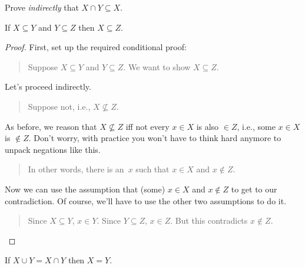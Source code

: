 \documentclass[../../../include/open-logic-section]{subfiles}
\begin{document}
\begin{prob}
Prove \emph{indirectly} that $X \cap Y \subseteq X$.
\end{prob}

\begin{prop}
If $X \subseteq Y$ and $Y \subseteq Z$ then $X \subseteq Z$.
\end{prop}

\begin{proof}
First, set up the required conditional proof:
\begin{quote}
Suppose $X \subseteq Y$ and $Y \subseteq Z$. We want to show $X
\subseteq Z$.
\end{quote}
Let's proceed indirectly.
\begin{quote}
Suppose not, i.e., $X \nsubseteq Z$.
\end{quote}
As before, we reason that $X \nsubseteq Z$ iff not every $x \in X$ is
also $\in Z$, i.e., some $x \in X$ is $\notin Z$.  Don't worry, with
practice you won't have to think hard anymore to unpack negations like
this.
\begin{quote}
In other words, there is an~$x$ such that $x \in X$ and $x \notin Z$.
\end{quote}
Now we can use the assumption that (some) $x \in X$ and $x \notin Z$
to get to our contradiction. Of course, we'll have to use the other
two assumptions to do it.
\begin{quote}
Since $X \subseteq Y$, $x \in Y$. Since $Y \subseteq Z$, $x \in
Z$. But this contradicts $x \notin Z$. \qedhere
\end{quote}
\end{proof}

\begin{prop}
If $X \cup Y = X \cap Y$ then $X = Y$.
\end{prop}
\end{document}
